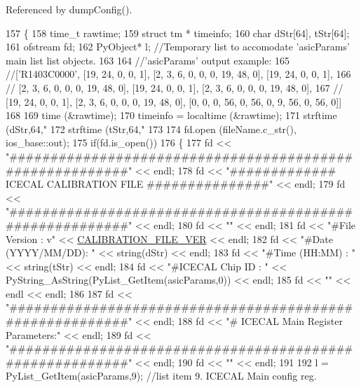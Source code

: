 Referenced by dump\+Config().


\begin{DoxyCode}
157 \{
158   time\_t rawtime;
159   \textcolor{keyword}{struct }tm * timeinfo;
160     \textcolor{keywordtype}{char} dStr[64], tStr[64];
161     ofstream fd;
162     PyObject* l;        \textcolor{comment}{//Temporary list to accomodate 'asicParams' main list list objects.}
163 
164     \textcolor{comment}{//'asicParams' output example:}
165     \textcolor{comment}{//['R1403C0000', [19, 24, 0, 0, 1], [2, 3, 6, 0, 0, 0, 19, 48, 0], [19, 24, 0, 0, 1],}
166     \textcolor{comment}{// [2, 3, 6, 0, 0, 0, 19, 48, 0], [19, 24, 0, 0, 1], [2, 3, 6, 0, 0, 0, 19, 48, 0], }
167     \textcolor{comment}{// [19, 24, 0, 0, 1], [2, 3, 6, 0, 0, 0, 19, 48, 0], [0, 0, 0, 56, 0, 56, 0, 9, 56, 0, 56, 0]]}
168 
169   time (&rawtime);
170   timeinfo = localtime (&rawtime);
171     strftime (dStr,64,\textcolor{stringliteral}{"%
172     strftime (tStr,64,\textcolor{stringliteral}{"%
173 
174     fd.open (fileName.c\_str(), ios\_base::out);
175     \textcolor{keywordflow}{if}(fd.is\_open())
176     \{
177         fd << \textcolor{stringliteral}{"#########################################################"} << endl;
178         fd << \textcolor{stringliteral}{"#############   ICECAL CALIBRATION FILE   ###############"} << endl;
179         fd << \textcolor{stringliteral}{"#########################################################"} << endl;
180         fd << \textcolor{stringliteral}{""} << endl;
181         fd << \textcolor{stringliteral}{"#File Version     : v"} << \hyperlink{ICECALv3_8h_ab10444bd2aa43310cf654abe4e4a7af6}{CALIBRATION\_FILE\_VER} << endl;
182         fd << \textcolor{stringliteral}{"#Date (YYYY/MM/DD): "} << string(dStr) << endl;
183         fd << \textcolor{stringliteral}{"#Time (HH:MM)     : "} << string(tStr) << endl;
184         fd << \textcolor{stringliteral}{"#ICECAL Chip ID   : "} << PyString\_AsString(PyList\_GetItem(asicParams,0)) << endl;
185         fd << \textcolor{stringliteral}{""} << endl << endl;
186     
187         fd << \textcolor{stringliteral}{"#########################################################"} << endl;
188         fd << \textcolor{stringliteral}{"# ICECAL Main Register Parameters:"} << endl;
189         fd << \textcolor{stringliteral}{"#########################################################"} << endl;
190         fd << \textcolor{stringliteral}{""} << endl;
191 
192         l = PyList\_GetItem(asicParams,9);       \textcolor{comment}{//list item 9. ICECAL Main config reg.}
}}
\end{DoxyCode}
